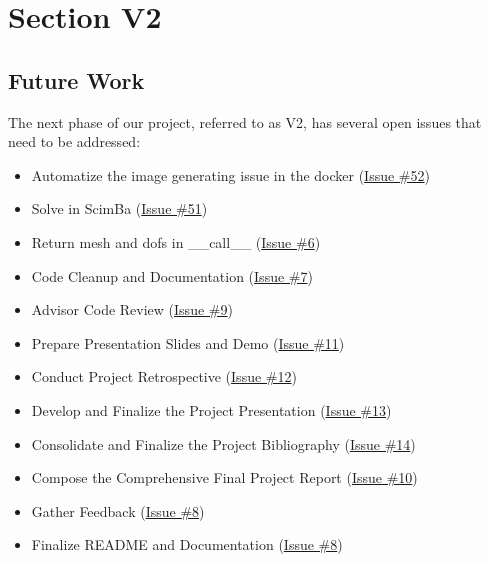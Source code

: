 \documentclass[12pt]{article}
\begin{document}
\newpage

\section{Section V2}
\label{sec:Section V2}

\newpage

\subsection{Future Work}

The next phase of our project, referred to as V2, has several open issues that need to be addressed:

\begin{itemize}
    \item Automatize the image generating issue in the docker (\href{https://github.com/master-csmi/2024-m1-scimba-feelpp/issues/52}{Issue \#52})
    \item Solve in ScimBa (\href{https://github.com/master-csmi/2024-m1-scimba-feelpp/issues/51}{Issue \#51})
    \item Return mesh and dofs in \_\_call\_\_ (\href{https://github.com/master-csmi/2024-m1-scimba-feelpp/issues/6}{Issue \#6})
    \item Code Cleanup and Documentation (\href{https://github.com/master-csmi/2024-m1-scimba-feelpp/issues/7}{Issue \#7})
    \item Advisor Code Review (\href{https://github.com/master-csmi/2024-m1-scimba-feelpp/issues/9}{Issue \#9})
    \item Prepare Presentation Slides and Demo (\href{https://github.com/master-csmi/2024-m1-scimba-feelpp/issues/11}{Issue \#11})
    \item Conduct Project Retrospective (\href{https://github.com/master-csmi/2024-m1-scimba-feelpp/issues/12}{Issue \#12})
    \item Develop and Finalize the Project Presentation (\href{https://github.com/master-csmi/2024-m1-scimba-feelpp/issues/13}{Issue \#13})
    \item Consolidate and Finalize the Project Bibliography (\href{https://github.com/master-csmi/2024-m1-scimba-feelpp/issues/14}{Issue \#14})
    \item Compose the Comprehensive Final Project Report (\href{https://github.com/master-csmi/2024-m1-scimba-feelpp/issues/10}{Issue \#10})
    \item Gather Feedback (\href{https://github.com/master-csmi/2024-m1-scimba-feelpp/issues/8}{Issue \#8})
    \item Finalize README and Documentation (\href{https://github.com/master-csmi/2024-m1-scimba-feelpp/issues/8}{Issue \#8})
\end{itemize}
\end{document}

